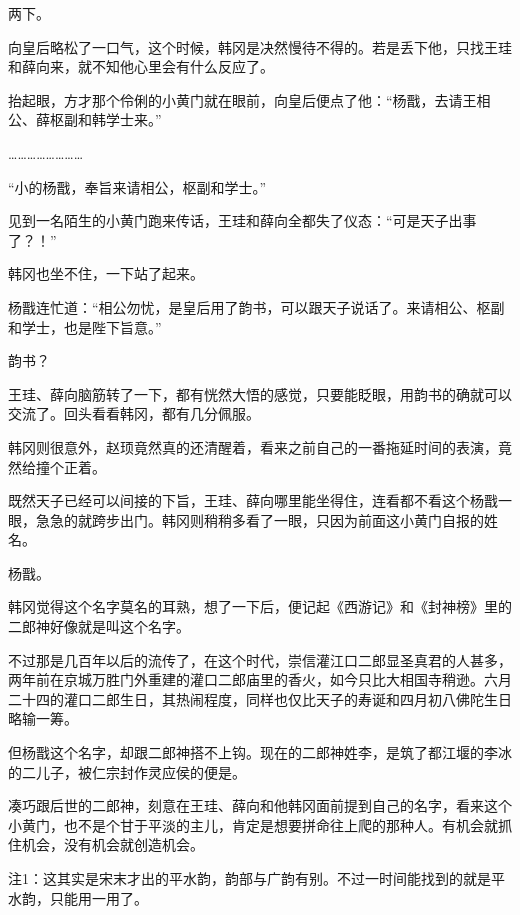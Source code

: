 两下。

向皇后略松了一口气，这个时候，韩冈是决然慢待不得的。若是丢下他，只找王珪和薛向来，就不知他心里会有什么反应了。

抬起眼，方才那个伶俐的小黄门就在眼前，向皇后便点了他：“杨戬，去请王相公、薛枢副和韩学士来。”

……………………

“小的杨戬，奉旨来请相公，枢副和学士。”

见到一名陌生的小黄门跑来传话，王珪和薛向全都失了仪态：“可是天子出事了？！”

韩冈也坐不住，一下站了起来。

杨戬连忙道：“相公勿忧，是皇后用了韵书，可以跟天子说话了。来请相公、枢副和学士，也是陛下旨意。”

韵书？

王珪、薛向脑筋转了一下，都有恍然大悟的感觉，只要能眨眼，用韵书的确就可以交流了。回头看看韩冈，都有几分佩服。

韩冈则很意外，赵顼竟然真的还清醒着，看来之前自己的一番拖延时间的表演，竟然给撞个正着。

既然天子已经可以间接的下旨，王珪、薛向哪里能坐得住，连看都不看这个杨戬一眼，急急的就跨步出门。韩冈则稍稍多看了一眼，只因为前面这小黄门自报的姓名。

杨戬。

韩冈觉得这个名字莫名的耳熟，想了一下后，便记起《西游记》和《封神榜》里的二郎神好像就是叫这个名字。

不过那是几百年以后的流传了，在这个时代，崇信灌江口二郎显圣真君的人甚多，两年前在京城万胜门外重建的灌口二郎庙里的香火，如今只比大相国寺稍逊。六月二十四的灌口二郎生日，其热闹程度，同样也仅比天子的寿诞和四月初八佛陀生日略输一筹。

但杨戬这个名字，却跟二郎神搭不上钩。现在的二郎神姓李，是筑了都江堰的李冰的二儿子，被仁宗封作灵应侯的便是。

凑巧跟后世的二郎神，刻意在王珪、薛向和他韩冈面前提到自己的名字，看来这个小黄门，也不是个甘于平淡的主儿，肯定是想要拼命往上爬的那种人。有机会就抓住机会，没有机会就创造机会。

注1：这其实是宋末才出的平水韵，韵部与广韵有别。不过一时间能找到的就是平水韵，只能用一用了。

